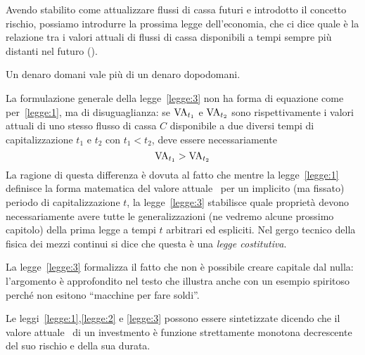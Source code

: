 Avendo stabilito come attualizzare flussi di cassa futuri e introdotto il concetto rischio, possiamo introdurre
la prossima legge dell'economia, che ci dice quale è la relazione tra i valori attuali di flussi di cassa
disponibili a tempi sempre più distanti nel futuro (\cite[§3.1.2 pp. 35--36]{brealey_et_al1999}).

\begin{legge}\label{legge:3}
  Un denaro domani vale più di un denaro dopodomani.
\end{legge}
La formulazione generale della legge~\ref{legge:3} non ha forma di equazione come per~\ref{legge:1}, ma di disuguaglianza:
se $\mathrm{VA}_{t_1}$ e $\mathrm{VA}_{t_2}$ sono rispettivamente i valori attuali di uno stesso flusso di
cassa $C$ disponibile a due diversi tempi di capitalizzazione $t_1$ e $t_2$ con $t_1<t_2$, deve essere necessariamente
\begin{equation}
  \label{eq:legge3}
  \mathrm{VA}_{t_1}>\mathrm{VA}_{t_2}
\end{equation}
La ragione di questa differenza è dovuta al fatto che mentre la legge~\ref{legge:1} definisce la forma matematica del
valore attuale \VA\ per un implicito (ma fissato) periodo di capitalizzazione $t$, la legge~\ref{legge:3}
stabilisce quale proprietà devono necessariamente avere tutte le generalizzazioni (ne vedremo alcune prossimo capitolo)
della prima legge a tempi $t$ arbitrari ed espliciti. Nel gergo tecnico della fisica dei mezzi continui si dice che
questa è una \emph{legge costitutiva}.
\begin{oss}
  La legge~\ref{legge:3} formalizza il fatto che non è possibile creare capitale dal nulla: l'argomento è approfondito
  nel testo \cite[§3.1.2 p. 35]{brealey_et_al1999} che illustra anche con un esempio spiritoso perché non esitono
  ``macchine  per fare soldi''.
\end{oss}
\begin{oss}
  Le leggi~\ref{legge:1},\ref{legge:2} e \ref{legge:3} possono essere sintetizzate dicendo che il valore attuale \VA\
  di un investmento è funzione strettamente monotona decrescente del suo rischio e della sua durata.
\end{oss}

